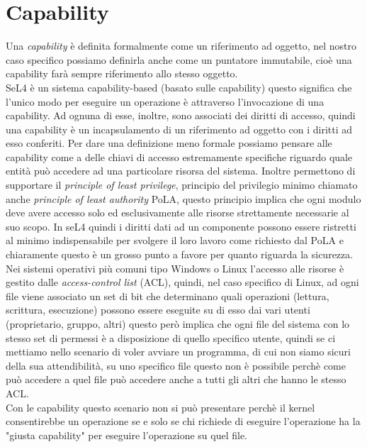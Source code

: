 \section{Capability}
Una \textit{capability} è definita formalmente come un riferimento ad oggetto, nel nostro caso specifico possiamo definirla anche come un puntatore immutabile, cioè una capability farà sempre riferimento allo stesso oggetto.\\
SeL4 è un sistema capability-based (basato sulle capability) 
questo significa che l'unico modo per eseguire un operazione è attraverso l'invocazione di una capability. Ad ognuna di esse, inoltre, sono associati dei diritti di accesso, quindi una capability è un incapsulamento di un riferimento ad oggetto con i diritti ad esso conferiti.
Per dare una definizione meno formale possiamo pensare alle capability come a delle chiavi di accesso estremamente specifiche riguardo quale entità può accedere ad una particolare risorsa del sistema. Inoltre permettono di supportare il \textit{principle of least privilege}, principio del privilegio minimo chiamato anche \textit{principle of least authority} PoLA, questo principio implica che ogni modulo deve avere accesso solo ed esclusivamente alle risorse strettamente necessarie al suo scopo.
In seL4 quindi i diritti dati ad un componente possono essere ristretti al minimo indispensabile per svolgere il loro lavoro come richiesto dal PoLA e chiaramente questo è un grosso punto a favore per quanto riguarda la sicurezza.\\
Nei sistemi operativi più comuni tipo Windows o Linux l'accesso alle risorse è gestito dalle \textit{access-control list} (ACL), quindi, nel caso specifico di Linux, ad ogni file viene associato un set di bit che determinano quali operazioni (lettura, scrittura, esecuzione) possono essere eseguite su di esso dai vari utenti (proprietario, gruppo, altri) questo però implica che ogni file del sistema con lo stesso set di permessi è a disposizione di quello specifico utente, quindi se ci mettiamo nello scenario di voler avviare un programma, di cui non siamo sicuri della sua attendibilità, su uno specifico file questo non è possibile perchè come può accedere a quel file può accedere anche a tutti gli altri che hanno le stesso ACL.\\
Con le capability questo scenario non si può presentare perchè il kernel consentirebbe un operazione se e solo se chi richiede di eseguire l'operazione ha la "giusta capability" per eseguire l'operazione su quel file. 

